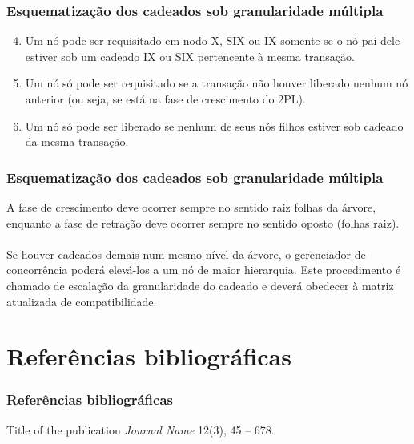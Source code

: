 \documentclass{beamer}
\begin{document}
\begin{frame}
    \frametitle{Esquematização dos cadeados sob granularidade múltipla}

    \begin{enumerate}
        \setcounter{enumi}{3}
        \item Um nó pode ser requisitado em nodo X, SIX ou IX somente se o nó pai dele estiver sob um cadeado IX ou SIX pertencente à mesma transação.
        \item Um nó só pode ser requisitado se a transação não houver liberado nenhum nó anterior (ou seja, se está na fase de crescimento do 2PL).
        \item Um nó só pode ser liberado se nenhum de seus nós filhos estiver sob cadeado da mesma transação.
    \end{enumerate}
    
\end{frame}


\begin{frame}
    \frametitle{Esquematização dos cadeados sob granularidade múltipla}
    
    A fase de crescimento deve ocorrer sempre no sentido raiz \Rightarrow folhas da árvore, enquanto a fase de retração deve ocorrer sempre no sentido oposto (folhas \Rightarrow raiz). \\~\\

    Se houver cadeados demais num mesmo nível da árvore, o gerenciador de concorrência poderá elevá-los a um nó de maior hierarquia. Este procedimento é chamado de escalação da granularidade do cadeado e deverá obedecer à matriz atualizada de compatibilidade.
\end{frame}


\section{Referências bibliográficas}
\begin{frame}
    \frametitle{Referências bibliográficas}
    \footnotesize{
    \begin{thebibliography}{99} %
    \newblock Title of the publication
    \newblock \emph{Journal Name} 12(3), 45 -- 678.
    \end{thebibliography}
    }
\end{frame}

\end{document}

